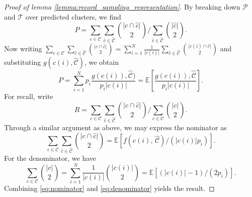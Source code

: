 \documentclass[fontsize=11pt]{article}
\theoremstyle{definition}
\begin{document}
\begin{proof}[Proof of lemma \ref{lemma:record_sampling_representation}]
By breaking down $\mathcal{P}$ and $\mathcal{T}$ over predicted clusters, we find
\begin{equation}
    P = \sum_{c\in\mathcal{C}} \sum_{\hat c \in \widehat{\mathcal{C}}} {\lvert c \cap \hat c \rvert \choose 2} \Big/ \sum_{\hat c \in \widehat{\mathcal{C}}} {\lvert \hat c \rvert \choose 2}.
\end{equation}
Now writing $\sum_{c \in \mathcal{C}} \sum_{\hat c \in \widehat{\mathcal{C}}}{\lvert c \cap \hat c \rvert \choose 2} = \sum_{i=1}^{N} \frac{1}{\lvert c(i) \rvert} \sum_{\hat c \in \widehat{\mathcal{C}}} {\lvert c(i) \cap \hat c \rvert \choose 2}$ and substituting $g(c(i), \widehat{\mathcal{C}})$, we obtain
\begin{equation}
    P = \sum_{i=1}^N p_i \frac{g(c(i)), \widehat{\mathcal{C}})}{p_i \lvert c(i) \rvert} = \mathbb{E}\left[ \frac{g(c(i)), \widehat{\mathcal{C}}}{p_i \lvert c(i) \rvert} \right].
\end{equation}
For recall, write 
\begin{equation}\label{eq:recall_cluster_form}
    R = \sum_{c\in\mathcal{C}} \sum_{\hat c \in \widehat{\mathcal{C}}} {\lvert c \cap \hat c \rvert \choose 2} \Big/ \sum_{ c \in {\mathcal{C}}} {\lvert c \rvert \choose 2}.
\end{equation}
Through a similar argument as above, we may express the nominator as 
\begin{equation}\label{eq:nominator}
    \sum_{c\in\mathcal{C}} \sum_{\hat c \in \widehat{\mathcal{C}}} {\lvert c \cap \hat c \rvert \choose 2} = \mathbb{E}\left[ f(c(i),\, \widehat{\mathcal{C}})  \big/ (\lvert c(i) \rvert p_i) \right].
\end{equation}
For the denominator, we have
\begin{equation}\label{eq:denominator}
    \sum_{c \in \mathcal{C}} {\lvert c \rvert \choose 2} = \sum_{i=1}^N \frac{1}{\lvert c(i) \rvert}  {\lvert c(i) \rvert \choose 2} = \mathbb{E}[ (\lvert c(i) \rvert - 1)/(2 p_i)].
\end{equation}
Combining \eqref{eq:nominator} and \eqref{eq:denominator} yields the result. 
\end{proof}
\end{document}
